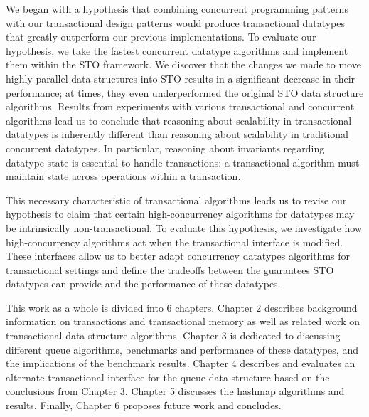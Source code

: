 We began with a hypothesis that combining concurrent programming patterns with our transactional design patterns would produce transactional datatypes that greatly outperform our previous implementations. To evaluate our hypothesis, we take the fastest concurrent datatype algorithms and implement them within the STO framework. We discover that the changes we made to move highly-parallel data structures into STO results in a significant decrease in their performance; at times, they even underperformed the original STO data structure algorithms. Results from experiments with various transactional and concurrent algorithms lead us to conclude that reasoning about scalability in transactional datatypes is inherently different than reasoning about scalability in traditional concurrent datatypes. In particular, reasoning about invariants regarding datatype state is essential to handle transactions: a transactional algorithm must maintain state across operations within a transaction. 

This necessary characteristic of transactional algorithms leads us to revise our hypothesis to claim that certain high-concurrency algorithms for datatypes may be intrinsically non-transactional. To evaluate this hypothesis, we investigate how high-concurrency algorithms act when the transactional interface is modified. These interfaces allow us to better adapt concurrency datatypes algorithms for transactional settings and define the tradeoffs between the guarantees STO datatypes can provide and the performance of these datatypes.

This work as a whole is divided into 6 chapters. Chapter 2 describes background information on transactions and transactional memory as well as related work on transactional data structure algorithms. Chapter 3 is dedicated to discussing different queue algorithms, benchmarks and performance of these datatypes, and the implications of the benchmark results. Chapter 4 describes and evaluates an alternate transactional interface for the queue data structure based on the conclusions from Chapter 3. Chapter 5 discusses the hashmap algorithms and results. Finally, Chapter 6 proposes future work and concludes.
